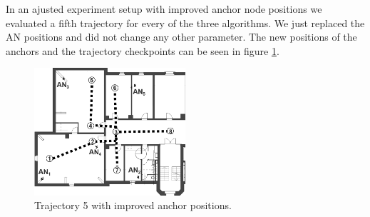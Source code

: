 In an ajusted experiment setup with improved anchor node positions we evaluated a fifth trajectory for every of the three algorithms. We just replaced the AN positions and did not change any other parameter. The new positions of the anchors and the trajectory checkpoints can be seen in figure \ref{fig:trajectory5_withAnchors}.

\begin{figure}[th]
\centering
\includegraphics[width=0.5\textwidth]{Figures/trajectory5_withAnchors}
\decoRule
\caption[Trajectory 5]{Trajectory 5 with improved anchor positions.}
\label{fig:trajectory5_withAnchors}
\end{figure}
